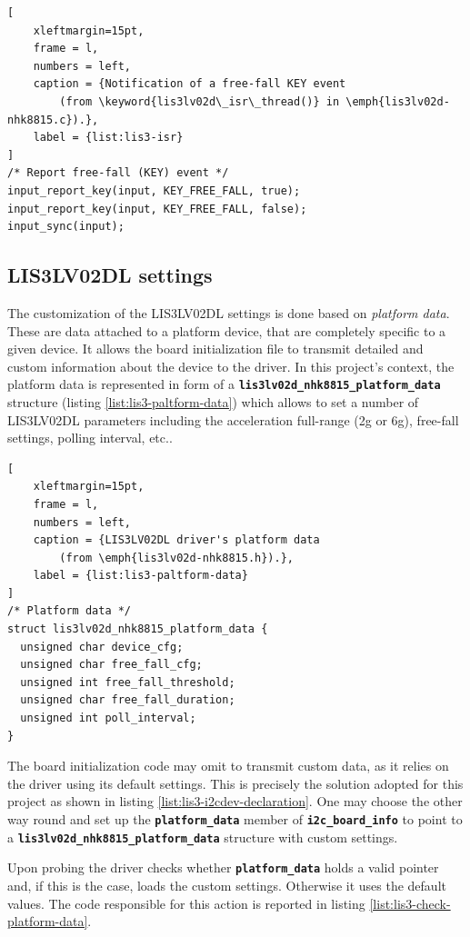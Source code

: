 \documentclass[a4paper,10pt]{article}
\newcommand{\keyword}[1]{\texttt{\textbf{#1}}}
\begin{document}
\begin{multicols}{2}
\begin{lstlisting}[
	xleftmargin=15pt,
	frame = l,
	numbers = left,
	caption = {Notification of a free-fall KEY event
		(from \keyword{lis3lv02d\_isr\_thread()} in \emph{lis3lv02d-nhk8815.c}).},
	label = {list:lis3-isr}
]
/* Report free-fall (KEY) event */
input_report_key(input, KEY_FREE_FALL, true);
input_report_key(input, KEY_FREE_FALL, false);
input_sync(input);
\end{lstlisting}


\subsection{LIS3LV02DL settings}
\label{sec:lis3_settings}

The customization of the LIS3LV02DL settings is done based on \emph{platform data}.
These are data attached to a platform device, that are completely specific to
a given device. It allows the board initialization file to transmit detailed and
custom information about the device to the driver.
In this project's context, the platform data is represented in form of a
\keyword{lis3lv02d\_nhk8815\_platform\_data} structure
(listing \ref{list:lis3-paltform-data}) which allows to set a number of LIS3LV02DL parameters including the acceleration full-range (2g or 6g), free-fall settings,
polling interval, etc..

\begin{lstlisting}[
	xleftmargin=15pt,
	frame = l,
	numbers = left,
	caption = {LIS3LV02DL driver's platform data
		(from \emph{lis3lv02d-nhk8815.h}).},
	label = {list:lis3-paltform-data}
]
/* Platform data */
struct lis3lv02d_nhk8815_platform_data {
  unsigned char device_cfg;
  unsigned char free_fall_cfg;
  unsigned int free_fall_threshold;
  unsigned char free_fall_duration;
  unsigned int poll_interval;
}
\end{lstlisting}

The board initialization code may omit to transmit custom data, as it relies on
the driver using its default settings. This is precisely the solution adopted for
this project as shown in listing \ref{list:lis3-i2cdev-declaration}.
One may choose the other way round and set up the \keyword{platform\_data}
member of \keyword{i2c\_board\_info} to point to a 
\keyword{lis3lv02d\_nhk8815\_platform\_data} structure with custom settings.

Upon probing the driver checks whether \keyword{platform\_data} holds a valid
pointer and, if this is the case, loads the custom settings. Otherwise it uses
the default values. The code responsible for this action is reported in listing
\ref{list:lis3-check-platform-data}.


\end{multicols}
\end{document}
